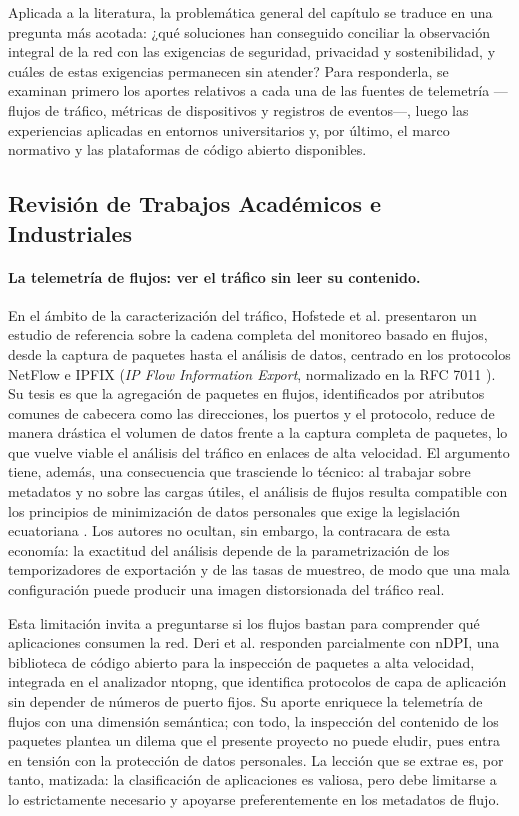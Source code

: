 Aplicada a la literatura, la problemática general del capítulo se traduce en una pregunta más acotada: ¿qué soluciones han conseguido conciliar la observación integral de la red con las exigencias de seguridad, privacidad y sostenibilidad, y cuáles de estas exigencias permanecen sin atender? Para responderla, se examinan primero los aportes relativos a cada una de las fuentes de telemetría ---flujos de tráfico, métricas de dispositivos y registros de eventos---, luego las experiencias aplicadas en entornos universitarios y, por último, el marco normativo y las plataformas de código abierto disponibles.

\subsection{Revisión de Trabajos Académicos e Industriales}

\paragraph{La telemetría de flujos: ver el tráfico sin leer su contenido.}
En el ámbito de la caracterización del tráfico, Hofstede et al. \cite{hofstede2014flow} presentaron un estudio de referencia sobre la cadena completa del monitoreo basado en flujos, desde la captura de paquetes hasta el análisis de datos, centrado en los protocolos NetFlow e IPFIX (\textit{IP Flow Information Export}, normalizado en la RFC 7011 \cite{claise2013ipfix}). Su tesis es que la agregación de paquetes en flujos, identificados por atributos comunes de cabecera como las direcciones, los puertos y el protocolo, reduce de manera drástica el volumen de datos frente a la captura completa de paquetes, lo que vuelve viable el análisis del tráfico en enlaces de alta velocidad. El argumento tiene, además, una consecuencia que trasciende lo técnico: al trabajar sobre metadatos y no sobre las cargas útiles, el análisis de flujos resulta compatible con los principios de minimización de datos personales que exige la legislación ecuatoriana \cite{lopdp2021}. Los autores no ocultan, sin embargo, la contracara de esta economía: la exactitud del análisis depende de la parametrización de los temporizadores de exportación y de las tasas de muestreo, de modo que una mala configuración puede producir una imagen distorsionada del tráfico real.

Esta limitación invita a preguntarse si los flujos bastan para comprender qué aplicaciones consumen la red. Deri et al. \cite{deri2014ndpi} responden parcialmente con nDPI, una biblioteca de código abierto para la inspección de paquetes a alta velocidad, integrada en el analizador ntopng, que identifica protocolos de capa de aplicación sin depender de números de puerto fijos. Su aporte enriquece la telemetría de flujos con una dimensión semántica; con todo, la inspección del contenido de los paquetes plantea un dilema que el presente proyecto no puede eludir, pues entra en tensión con la protección de datos personales. La lección que se extrae es, por tanto, matizada: la clasificación de aplicaciones es valiosa, pero debe limitarse a lo estrictamente necesario y apoyarse preferentemente en los metadatos de flujo.

